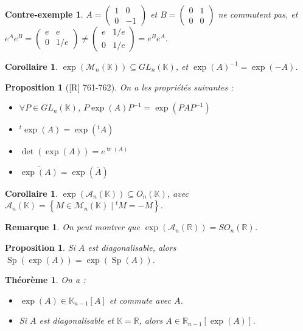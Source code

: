 \documentclass[10pt, a4paper, parskip=full, twoside, twocolumn]{report}
\newtheorem{theorem}[definition]{Théorème}
\newtheorem{proposition}[definition]{Proposition}
\newtheorem{corollary}[definition]{Corollaire}
\newtheorem{cexample}[definition]{Contre-exemple}
\newtheorem{remark}[definition]{Remarque}
\newcommand{\IK}{\mathbb{K}}
\newcommand{\IR}{\mathbb{R}}
\DeclareMathOperator{\tr}{tr}
\DeclareMathOperator{\Sp}{Sp}
\begin{document}
\begin{cexample}
	$A = \begin{pmatrix}
		1 & 0 \\ 0 & -1
	\end{pmatrix}$ et $B = \begin{pmatrix}
		0&1\\0&0
	\end{pmatrix}$ ne commutent pas, et $e^A e^B = \begin{pmatrix}
		e&e\\0& 1/e
	\end{pmatrix} \neq \begin{pmatrix}
		e & 1/e \\ 0 & 1/e
	\end{pmatrix} = e^B e^A$.
\end{cexample}

\begin{corollary}
	$\exp(\mathcal{M}_n(\IK)) \subseteq GL_n(\IK)$, et $\exp(A)^{-1} = \exp(-A)$.
\end{corollary}

\begin{proposition}[\textnormal{[R] 761-762}]
	On a les propriétés suivantes :
	\begin{itemize}
		\item $\forall P\in GL_n(\IK)$, $P\exp(A)P^{-1}=\exp(PAP^{-1})$
		\item ${}^t\exp(A) = \exp({}^tA)$
		\item $\det(\exp(A)) = e^{\tr(A)}$
		\item $\overline{\exp(A)} = \exp(\overline{A})$
	\end{itemize}
\end{proposition}

\begin{corollary}
	$\exp(\mathcal{A}_n(\IK)) \subseteq O_n(\IK)$, avec $\mathcal{A}_n(\IK) = \left\{M\in\mathcal{M}_n(\IK)\mid {}^tM = -M\right\}$.
\end{corollary}

\begin{remark}
	On peut montrer que $\exp(\mathcal{A}_n(\IR)) = SO_n(\IR)$.
\end{remark}

\begin{proposition}
	Si $A$ est diagonalisable, alors $\Sp(\exp(A)) = \exp(\Sp(A))$.
\end{proposition}

\begin{theorem}
	On a :
	\begin{itemize}
		\item $\exp(A)\in \IK_{n-1}[A]$ et commute avec $A$.
		\item Si $A$ est diagonalisable et $\IK = \IR$, alors $A\in \IR_{n-1}[\exp(A)]$.
	\end{itemize}
\end{theorem}
\end{document}
